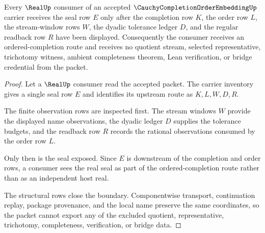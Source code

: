 \begin{theorem}
\label{thm:cauchy-completion-order-embedding-real-seal-boundary}
Every $\RealUp$ consumer of an accepted $\CauchyCompletionOrderEmbeddingUp$ carrier receives the seal row $E$ only after the completion row $K$, the order row $L$, the stream-window rows $W$, the dyadic tolerance ledger $D$, and the regular readback row $R$ have been displayed. Consequently the consumer receives an ordered-completion route and receives no quotient stream, selected representative, trichotomy witness, ambient completeness theorem, Lean verification, or bridge credential from the packet.
\end{theorem}
\begin{proof}
Let a $\RealUp$ consumer read the accepted packet. The carrier inventory gives a single seal row $E$ and identifies its upstream route as $K,L,W,D,R$.

The finite observation rows are inspected first. The stream windows $W$ provide the displayed name observations, the dyadic ledger $D$ supplies the tolerance budgets, and the readback row $R$ records the rational observations consumed by the order row $L$.

Only then is the seal exposed. Since $E$ is downstream of the completion and order rows, a consumer sees the real seal as part of the ordered-completion route rather than as an independent host real.

The structural rows close the boundary. Componentwise transport, continuation replay, package provenance, and the local name preserve the same coordinates, so the packet cannot export any of the excluded quotient, representative, trichotomy, completeness, verification, or bridge data.
\end{proof}


\begin{closurestatus}{\CauchyCompletionOrderEmbeddingUp}
  \theoryclosure{\seedClosure}
  \formalstatus{\unformalizedV}
\end{closurestatus}
